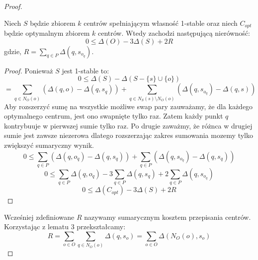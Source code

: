 \begin{proof}
    \begin{lemma}
        Niech $S$ będzie zbiorem $k$ centrów spełniającym własność 1-stable oraz niech $C_{opt}$ będzie optymalnym zbiorem $k$ centrów.
        Wtedy zachodzi następującą nierówność:
        \begin{equation}
            0 \leq \Delta(O) - 3\Delta(S) + 2R
        \end{equation}
        gdzie, $R = \sum_{q \in P} \Delta(q, s_{o_{q}})$.
    \end{lemma}
    \begin{proof}
        Ponieważ $S$ jest 1-stable to:
        \begin{equation}
           0 \leq \Delta(S) -  \Delta(S - \{s\} \cup \{o\})
        \end{equation}
        \begin{equation}
            = \sum_{q \in N_{O}(o)} (\Delta(q, o) - \Delta(q, s_{q})) + \sum_{q \in N_{S}(s) \setminus N_{O}(o)} (\Delta(q, s_{o_{q}}) - \Delta(q, s))
        \end{equation}
        Aby rozszerzyć sumę na wszystkie możliwe swap pary zauważamy, że dla każdego optymalnego centrum, jest ono swapnięte tylko raz.
        Zatem każdy punkt $q$ kontrybuuje w pierwszej sumie tylko raz.
        Po drugie zaważmy, że różnca w drugiej sumie jest zawsze niezerowa dlatego rozszerzając zakres sumowania mozemy tylko zwiększyć sumaryczny wynik.
        \begin{equation}
            0 \leq \sum_{q \in P} (\Delta(q, o_{q}) - \Delta(q, s_{q})) + \sum_{q \in P} (\Delta(q, s_{o_{q}}) - \Delta(q, s_{q}))
        \end{equation}
        \begin{equation}
            0 \leq \sum_{q \in P} \Delta(q, o_{q}) - 3 \sum_{q \in P} \Delta(q, s_{q}) + 2\sum_{q \in P} \Delta(q, s_{o_{q}})
        \end{equation}
        \begin{equation}
            0 \leq \Delta(C_{opt}) - 3 \Delta(S) + 2R
        \end{equation}
    \end{proof}
    \noindent
    Wcześniej zdefiniowane $R$ nazywamy sumarycznym kosztem przepisania centrów.
    Korzystając z lematu 3 przekształcamy:
    \begin{equation}
        R = \sum_{o \in O} \sum_{q \in N_{O}(o)} \Delta(q, s_{o}) = \sum_{o \in O} \Delta(N_{O}(o), s_{o}) 
    \end{equation}
    \begin{equation}

\end{equation}
\end{proof}
